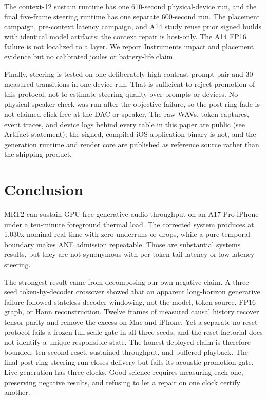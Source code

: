 \documentclass[10pt]{article}
\begin{document}
The context-12 sustain runtime has one 610-second physical-device run, and the final five-frame steering runtime has one separate 600-second run. The placement campaign, pre-context latency campaign, and A14 study reuse prior signed builds with identical model artifacts; the context repair is host-only. The A14 FP16 failure is not localized to a layer. We report Instruments impact and placement evidence but no calibrated joules or battery-life claim.

Finally, steering is tested on one deliberately high-contrast prompt pair and 30 measured transitions in one device run. That is sufficient to reject promotion of this protocol, not to estimate steering quality over prompts or devices. No physical-speaker check was run after the objective failure, so the post-ring fade is not claimed click-free at the DAC or speaker. The raw WAVs, token captures, event traces, and device logs behind every table in this paper are public (see Artifact statement); the signed, compiled iOS application binary is not, and the generation runtime and render core are published as reference source rather than the shipping product.

\section{Conclusion}
MRT2 can sustain GPU-free generative-audio throughput on an A17 Pro iPhone under a ten-minute foreground thermal load. The corrected system produces at 1.030x nominal real time with zero underruns or drops, while a pure temporal boundary makes ANE admission repeatable. Those are substantial systems results, but they are not synonymous with per-token tail latency or low-latency steering.

The strongest result came from decomposing our own negative claim. A three-seed token-by-decoder crossover showed that an apparent long-horizon generative failure followed stateless decoder windowing, not the model, token source, FP16 graph, or Hann reconstruction. Twelve frames of measured causal history recover tensor parity and remove the excess on Mac and iPhone. Yet a separate no-reset protocol fails a frozen full-scale gate in all three seeds, and the reset factorial does not identify a unique responsible state. The honest deployed claim is therefore bounded: ten-second reset, sustained throughput, and buffered playback. The final post-ring steering run closes delivery but fails its acoustic promotion gate. Live generation has three clocks. Good science requires measuring each one, preserving negative results, and refusing to let a repair on one clock certify another.
\end{document}
